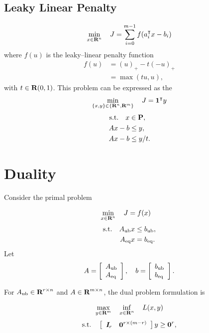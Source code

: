 \documentclass{article}
\begin{document}
\subsection{Leaky Linear Penalty}
    \begin{align*}
        \min_{x\in\textbf{R}^n}\quad J=\sum_{i=0}^{m-1}f(a_i^\intercal x-b_i)
    \end{align*}
    where $f(u)$ is the leaky--linear penalty function
    \begin{align*}
        f(u)&=(u)_+-t(-u)_+\\
        &=\max(t u,u),
    \end{align*}
    with $t\in\textbf{R}(0,1)$.
    This problem can be expressed as the \LP
    \begin{align*}
        \min_{\{x,y\}\in\{\textbf{R}^n,\textbf{R}^m\}}\quad J= \textbf{1}^\intercal y
    \end{align*}
    \begin{align*}
        \text{s.t.}\quad x &\in \textbf{P},\\
        A x - b &\leq y,\\
        A x - b &\leq y/t.
    \end{align*}

\clearpage


\section{Duality}

Consider the primal problem

\begin{align*}
    \min_{x\in\textbf{R}^n}\quad
    J
    &=
            f(x)
\end{align*}
\begin{align*}
    \text{s.t.}\quad A_{\text{ub}} x&\leq b_{\text{ub}},\\
    A_{\text{eq}} x &= b_{\text{eq}}.\\
\end{align*}
Let
\begin{align*}
    A = \left[\begin{array}{lllllllllllllllllll}A_{\text{ub}} \\ A_{\text{eq}}\end{array}\right],\quad
    b = \left[\begin{array}{lllllllllllllllllll}b_{\text{ub}}\\b_{\text{eq}}\end{array}\right].
\end{align*}


For $A_{\text{ub}}\in\textbf{R}^{{r}\times n}$ and $A\in\textbf{R}^{m\times n}$, the dual problem formulation is

\begin{align*}
    \max_{y\in\textbf{R}^m}\quad 
    \inf_{x\in\textbf{R}^n}\quad L(x,y)
\end{align*}
\begin{align*}
    \text{s.t.}\quad  \left[\begin{array}{lllllllllllllllllll}\emph{\textbf{I}}_{r}&\textbf{0}^{{r}\times (m-{r})}\end{array}\right]y\geq \textbf{0}^{r},
\end{align*}
\end{document}
